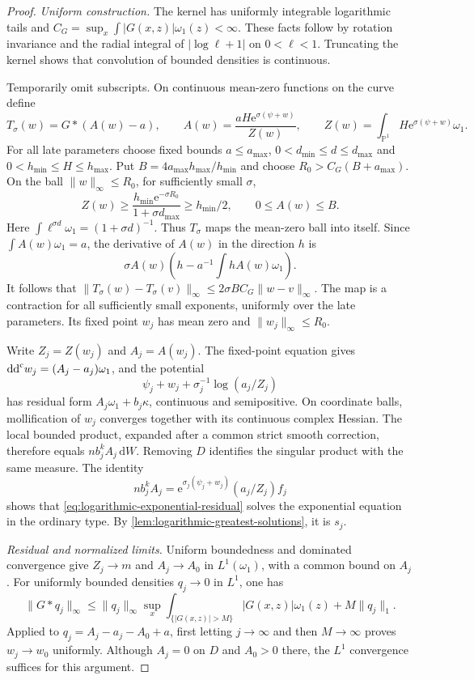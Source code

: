 \begin{proof}
\emph{Uniform construction.} The kernel has uniformly integrable logarithmic tails and
$C_G=\sup_x\int|G(x,z)|\omega_1(z)<\infty$. These facts follow by rotation invariance and the radial integral of $|\log\ell+1|$ on $0<\ell<1$. Truncating the kernel shows that convolution of bounded densities is continuous.

Temporarily omit subscripts. On continuous mean-zero functions on the curve define
\[
 T_\sigma(w)=G*(A(w)-a),\qquad
 A(w)=\frac{aH\mathrm{e}^{\sigma(\psi+w)}}{Z(w)},\qquad
 Z(w)=\int_{\mathbb P^1}H\mathrm{e}^{\sigma(\psi+w)}\omega_1.
\]
For all late parameters choose fixed bounds $a\leq a_{\max}$, $0<d_{\min}\leq d\leq d_{\max}$ and $0<h_{\min}\leq H\leq h_{\max}$. Put $B=4a_{\max}h_{\max}/h_{\min}$ and choose $R_0>C_G(B+a_{\max})$. On the ball $\|w\|_\infty\leq R_0$, for sufficiently small $\sigma$,
\[
 Z(w)\geq\frac{h_{\min}\mathrm{e}^{-\sigma R_0}}{1+\sigma d_{\max}}
       \geq h_{\min}/2,\qquad 0\leq A(w)\leq B.
\]
Here $\int\ell^{\sigma d}\omega_1=(1+\sigma d)^{-1}$. Thus $T_\sigma$ maps the mean-zero ball into itself. Since $\int A(w)\omega_1=a$, the derivative of $A(w)$ in the direction $h$ is
\[
 \sigma A(w)\left(h-a^{-1}\int hA(w)\omega_1\right).
\]
It follows that $\|T_\sigma(w)-T_\sigma(v)\|_\infty\leq2\sigma B C_G\|w-v\|_\infty$. The map is a contraction for all sufficiently small exponents, uniformly over the late parameters. Its fixed point $w_j$ has mean zero and $\|w_j\|_\infty\leq R_0$.

Write $Z_j=Z(w_j)$ and $A_j=A(w_j)$. The fixed-point equation gives $\mathrm{dd}^{\mathrm{c}} w_j=(A_j-a_j)\omega_1$, and the potential
\begin{equation}\label{eq:logarithmic-exponential-residual}
 \psi_j+w_j+\sigma_j^{-1}\log(a_j/Z_j)
\end{equation}
has residual form $A_j\omega_1+b_j\kappa$, continuous and semipositive. On coordinate balls, mollification of $w_j$ converges together with its continuous complex Hessian. The local bounded product, expanded after a common strict smooth correction, therefore equals $n b_j^kA_j\,\mathrm{d}W$. Removing $D$ identifies the singular product with the same measure. The identity
\[
 n b_j^kA_j=\mathrm{e}^{\sigma_j(\psi_j+w_j)}(a_j/Z_j)f_j
\]
shows that \eqref{eq:logarithmic-exponential-residual} solves the exponential equation in the ordinary type. By \cref{lem:logarithmic-greatest-solutions}, it is $s_j$.

\emph{Residual and normalized limits.} Uniform boundedness and dominated convergence give $Z_j\to m$ and $A_j\to A_0$ in $L^1(\omega_1)$, with a common bound on $A_j$. For uniformly bounded densities $q_j\to0$ in $L^1$, one has
\[
 \|G*q_j\|_\infty\leq\|q_j\|_\infty
       \sup_x\int_{\{|G(x,z)|>M\}}|G(x,z)|\omega_1(z)
       +M\|q_j\|_1.
\]
Applied to $q_j=A_j-a_j-A_0+a$, first letting $j\to\infty$ and then $M\to\infty$ proves $w_j\to w_0$ uniformly. Although $A_j=0$ on $D$ and $A_0>0$ there, the $L^1$ convergence suffices for this argument.


\end{proof}
